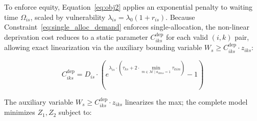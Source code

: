 \documentclass{llncs}
\begin{document}
%
To enforce equity, Equation~\eqref{eq:obj2} applies an exponential penalty to waiting time $\Omega_{is}$, scaled by vulnerability $\lambda_{is}=\lambda_0(1+r_{is})$. Because Constraint~\eqref{eq:single_alloc_demand} enforces single-allocation, the non-linear deprivation cost reduces to a static parameter $C^{\text{dep}}_{iks}$ for each valid $(i,k)$ pair, allowing exact linearization via the auxiliary bounding variable $W_s \ge C^{\text{dep}}_{iks} \cdot z_{iks}$:

\begin{equation} \label{eq:deprivation_cost}
    C^{\text{dep}}_{iks} = D_{is} \cdot \left(e^{\lambda_{is} \cdot \left(\tau_{ks} + 2 \cdot \min_{m \in \mathcal{M} \mid a_{ikms}=1} \tau_{kim}\right)} - 1\right)
\end{equation}

%
%
The auxiliary variable $W_s\ge C^{\text{dep}}_{iks}\cdot z_{iks}$ linearizes the max; the complete model minimizes $Z_1,Z_2$ subject to:
\end{document}
